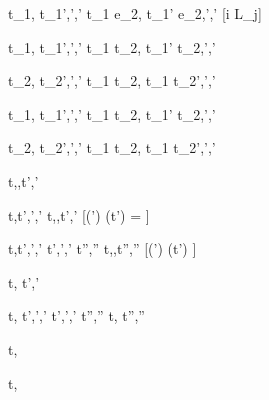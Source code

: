   {t_1,\sigma {} t_1',\sigma',\delta'}
  {t_1 \Step e_2,\sigma {} t_1' \Step e_2,\sigma',\delta'}
  [i \neq \IContinue L_j]

  {t_1,\sigma {} t_1',\sigma',\delta'}
  {t_1 \Pair t_2,\sigma {} t_1' \Pair t_2,\sigma',\delta'}

  {t_2,\sigma {} t_2',\sigma',\delta'}
  {t_1 \Pair t_2,\sigma {} t_1 \Pair t_2',\sigma',\delta'}

  {t_1,\sigma {} t_1',\sigma',\delta'}
  {t_1 \Choose t_2,\sigma {} t_1' \Choose t_2,\sigma',\delta'}

  {t_2,\sigma {} t_2',\sigma',\delta'}
  {t_1 \Choose t_2,\sigma {} t_1 \Choose t_2',\sigma',\delta'}



  {t,\sigma,\delta \fix t',\sigma'}

  {t,\sigma \normalise t',\sigma',\delta'}
  {t,\sigma,\delta \fix t',\sigma'}
  [(\delta \cup \delta') \cap \Watching(t') = \nothing]

  {t,\sigma \normalise t',\sigma',\delta' \Quad
   t',\sigma',\delta' \fix t'',\sigma''}
  {t,\sigma,\delta \fix t'',\sigma''}
  [(\delta \cup \delta') \cap \Watching(t') \neq \nothing]


  {t,\sigma {} t',\sigma'}


  {t,\sigma {} t',\sigma',\delta' \Quad
   t',\sigma',\delta' \fix t'',\sigma''}
  {t,\sigma {} t'',\sigma''}



  {t,\sigma \extract {}}

  {t,\sigma \simulate {}}
